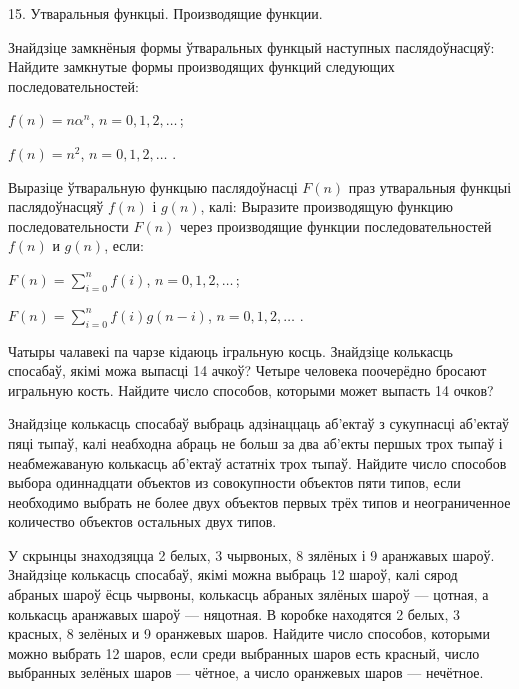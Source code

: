 



\biLangHeader
{15. Утваральныя функцыі.}
{Производящие функции.}

\begin{problemList}

\problemItemWithCommonPart
{Знайдзіце замкнёныя формы ўтваральных функцый наступных паслядоўнасцяў:}
{Найдите замкнутые формы производящих функций следующих последовательностей:}
{\begin{belarusianEnumerate}
  \item $f(n) = n\alpha^n$, $n = 0, 1, 2, \ldots\, $;
  \item $f(n) = n^2$, $n = 0, 1, 2, \ldots\,\, $.
\end{belarusianEnumerate}}

\problemItemWithCommonPart
{Выразіце ўтваральную функцыю паслядоўнасці $F(n)$ праз утваральныя функцыі
паслядоўнасцяў $f(n)$ і $g(n)$, калі:}
{Выразите производящую функцию последовательности $F(n)$ через производящие
функции последовательностей $f(n)$ и $g(n)$, если:}
{\begin{belarusianEnumerate}
  \item $F(n) = \sum_{i = 0}^n f(i)$, $n = 0, 1, 2, \ldots\, $;
  \item $F(n) = \sum_{i = 0}^n f(i)g(n - i)$, $n = 0, 1, 2, \ldots\,\, $.
\end{belarusianEnumerate}}

\problemItemSimple
{Чатыры чалавекі па чарзе кідаюць ігральную косць. Знайдзіце колькасць спосабаў,
якімі можа выпасці 14 ачкоў?}
{Четыре человека поочерёдно бросают игральную кость. Найдите число способов,
которыми может выпасть 14 очков?}

\problemItemSimple
{Знайдзіце колькасць спосабаў выбраць адзінаццаць аб'ектаў з сукупнасці аб'ектаў
пяці тыпаў, калі неабходна абраць не больш за два аб'екты першых трох тыпаў і неабмежаваную
колькасць аб'ектаў астатніх трох тыпаў.}
{Найдите число способов выбора одиннадцати объектов из совокупности объектов
пяти типов, если необходимо выбрать не более двух объектов первых трёх типов и
неограниченное количество объектов остальных двух типов.}

\problemItemSimple
{У скрынцы знаходзяцца 2 белых, 3 чырвоных, 8 зялёных і 9 аранжавых шароў.
Знайдзіце колькасць спосабаў, якімі можна выбраць 12 шароў, калі сярод абраных шароў
ёсць чырвоны, колькасць абраных зялёных шароў --- цотная, а колькасць аранжавых шароў --- няцотная.}
{В коробке находятся 2 белых, 3 красных, 8 зелёных и 9 оранжевых шаров.
Найдите число способов, которыми можно выбрать 12 шаров, если среди выбранных шаров
есть красный, число выбранных зелёных шаров --- чётное, а число оранжевых шаров --- нечётное.}


\end{problemList}
